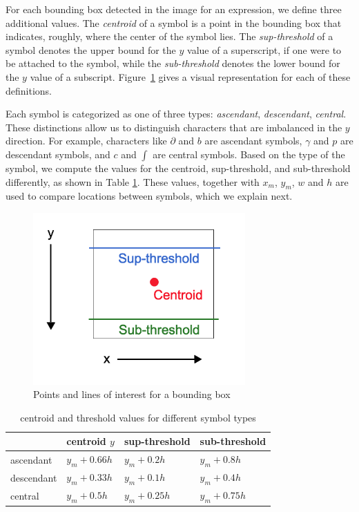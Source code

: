 \documentclass[10pt]{IEEEtran}
\begin{document}
For each bounding box detected in the image for an expression, we define three additional values. The \textit{centroid} of a symbol is a point in the bounding box that indicates, roughly, where the center of the symbol lies. The \textit{sup-threshold} of a symbol denotes the upper bound for the $y$ value of a superscript, if one were to be attached to the symbol, while the \textit{sub-threshold} denotes the lower bound for the $y$ value of a subscript. Figure~\ref{fig:values} gives a visual representation for each of these definitions.

Each symbol is categorized as one of three types: \textit{ascendant}, \textit{descendant}, \textit{central}. These distinctions allow us to distinguish characters that are imbalanced in the $y$ direction. For example, characters like $\partial$ and $b$ are ascendant symbols, $\gamma$ and $p$ are descendant symbols, and $c$ and $\int$ are central symbols. Based on the type of the symbol, we compute the values for the centroid, sup-threshold, and sub-threshold differently, as shown in Table \ref{tab:values}. These values, together with $x_m$, $y_m$, $w$ and $h$ are used to compare locations between symbols, which we explain next.

\begin{figure}[h]
  \centering
    \includegraphics[width=3.2in]{values.png}
  \caption{Points and lines of interest for a bounding box}
  \label{fig:values}
\end{figure}

\begin{table}[h]
  \caption{centroid and threshold values for different symbol types}
  \centering
  \begin{tabular}{l l l l}
  \hline
  & centroid $y$ & sup-threshold & sub-threshold\\
  \hline
  ascendant & $y_m + 0.66h$ & $y_m + 0.2h$ & $y_m+0.8h$\\
  descendant & $y_m+ 0.33h$ & $y_m +0.1h$ & $y_m+0.4h$\\
  central & $y_m+0.5h$ & $y_m+0.25h$ & $y_m+0.75h$\\
  \hline
  \end{tabular}
  \label{tab:values}
\end{table}
\end{document}
